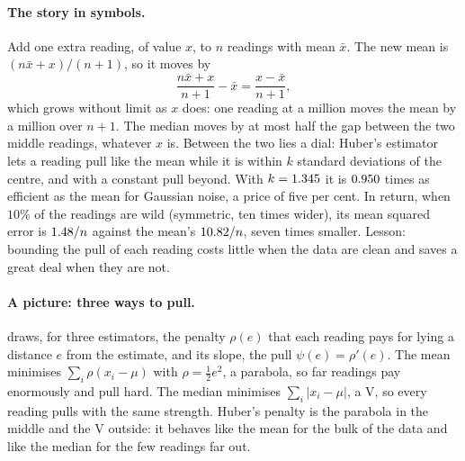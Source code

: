 \paragraph{The story in symbols.}
Add one extra reading, of value $x$, to $n$ readings with mean $\bar x$. The
new mean is $(n\bar x+x)/(n+1)$, so it moves by
\begin{equation}
  \frac{n\bar x+x}{n+1}-\bar x=\frac{x-\bar x}{n+1} ,
  \label{T5a:eq:mean-shift}
\end{equation}
which grows without limit as $x$ does: one reading at a million moves the
mean by a million over $n+1$. The median moves by at most half the gap
between the two middle readings, whatever $x$ is. Between the two lies a
dial: Huber's estimator lets a reading pull like the mean while it is within
$k$ standard deviations of the centre, and with a constant pull beyond. With
$k=1.345$ it is $0.950$ times as efficient as the mean for
Gaussian noise, a price of five per cent. In return, when $10\%$ of the
readings are wild (symmetric, ten times wider), its mean squared error is
$1.48/n$ against the mean's $10.82/n$, seven
times smaller. Lesson: bounding the pull of each reading costs little when
the data are clean and saves a great deal when they are not.

\paragraph{A picture: three ways to pull.}
 draws, for three estimators, the penalty $\rho(e)$
that each reading pays for lying a distance $e$ from the estimate, and its
slope, the pull $\psi(e)=\rho'(e)$. The mean minimises $\sum_i\rho(x_i-\mu)$
with $\rho=\frac12e^2$, a parabola, so far readings pay enormously and pull
hard. The median minimises $\sum_i|x_i-\mu|$, a V, so every reading pulls
with the same strength. Huber's penalty is the parabola in the middle and
the V outside: it behaves like the mean for the bulk of the data and like
the median for the few readings far out.

